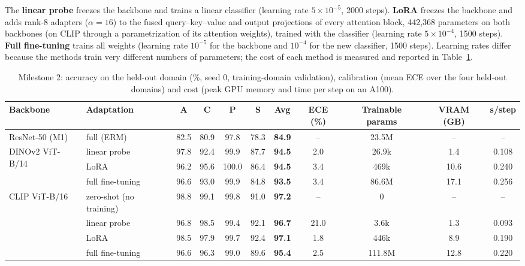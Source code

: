 \documentclass[conference]{IEEEtran}
\begin{document}
The \textbf{linear probe} freezes the backbone and trains a linear classifier (learning rate $5\times10^{-5}$, 2000 steps). \textbf{LoRA} freezes the backbone and adds rank-8 adapters ($\alpha=16$) to the fused query--key--value and output projections of every attention block, 442{,}368 parameters on both backbones (on CLIP through a parametrization of its attention weights), trained with the classifier (learning rate $5\times10^{-4}$, 1500 steps). \textbf{Full fine-tuning} trains all weights (learning rate $10^{-5}$ for the backbone and $10^{-4}$ for the new classifier, 1500 steps). Learning rates differ because the methods train very different numbers of parameters; the cost of each method is measured and reported in Table~\ref{tab:m2}.

\begin{table}[t]
\centering
\caption{Milestone 2: accuracy on the held-out domain (\%, seed 0, training-domain validation), calibration (mean ECE over the four held-out domains) and cost (peak GPU memory and time per step on an A100).}
\label{tab:m2}
\begin{tabular}{llccccccccc}
\toprule
Backbone & Adaptation & A & C & P & S & \textbf{Avg} & ECE (\%) & Trainable params & VRAM (GB) & s/step\\
\midrule
ResNet-50 (M1) & full (ERM) & 82.5 & 80.9 & 97.8 & 78.3 & \textbf{84.9} & -- & 23.5M & -- & -- \\
\midrule
\multirow{3}{*}{DINOv2 ViT-B/14} & linear probe & 97.8 & 92.4 & 99.9 & 87.7 & \textbf{94.5} & 2.0 & 26.9k & 1.4 & 0.108\\
 & LoRA & 96.2 & 95.6 & 100.0 & 86.4 & \textbf{94.5} & 3.4 & 469k & 10.6 & 0.240\\
 & full fine-tuning & 96.6 & 93.0 & 99.9 & 84.8 & \textbf{93.5} & 3.4 & 86.6M & 17.1 & 0.256\\
\midrule
\multirow{4}{*}{CLIP ViT-B/16} & zero-shot (no training) & 98.8 & 99.1 & 99.8 & 91.0 & \textbf{97.2} & -- & 0 & -- & --\\
 & linear probe & 96.8 & 98.5 & 99.4 & 92.1 & \textbf{96.7} & 21.0 & 3.6k & 1.3 & 0.093\\
 & LoRA & 98.5 & 97.9 & 99.7 & 92.4 & \textbf{97.1} & 1.8 & 446k & 8.9 & 0.190\\
 & full fine-tuning & 96.6 & 96.3 & 99.0 & 89.6 & \textbf{95.4} & 2.5 & 111.8M & 12.8 & 0.220\\
\bottomrule
\end{tabular}
\end{table}
\end{document}
